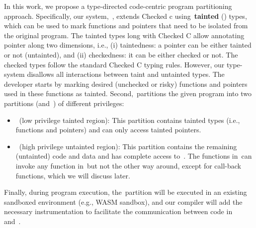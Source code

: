 In this work, we propose a type-directed code-centric program partitioning approach.
Specifically, our system,~\systemname, extends Checked c using~\textbf{tainted} (\taintt) types, which can be used to mark functions and pointers that need to be isolated from the original program.
The tainted types long with Checked C allow annotating pointer along two dimensions, i.e., (i) taintedness: a pointer can be either tainted or not (untainted), and (ii) checkedness: it can be either checked or not.
The checked types follow the standard Checked C typing rules. However, our type-system disallows all interactions between taint and untainted types.
The developer starts by marking desired (unchecked or risky) functions and pointers used in these functions as tainted.
Second,~\systemname partitions the given program into two partitions (\ucregion and~\cregion)  of different privileges:
\begin{itemize}
\item~\ucregion (low privilege tainted region): This partition contains tainted types (i.e., functions and pointers) and can only access tainted pointers.
\item~\cregion (high privilege untainted region): This partition contains the remaining (untainted) code and data and has complete access to~\cregion{}.
The functions in~\cregion can invoke any function in~\ucregion but not the other way around, except for call-back functions, which we will discuss later.
\end{itemize}
Finally, during program execution, the~\ucregion partition will be executed in an existing sandboxed environment (e.g., WASM sandbox), and our compiler will add the necessary instrumentation to facilitate the communication between code in~\cregion{} and~\ucregion{}.





